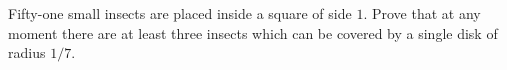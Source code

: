 Fifty-one small insects are placed inside a square of side $1$. Prove that at any moment there are at least three insects which can be covered by a single disk of radius $1/7$.
